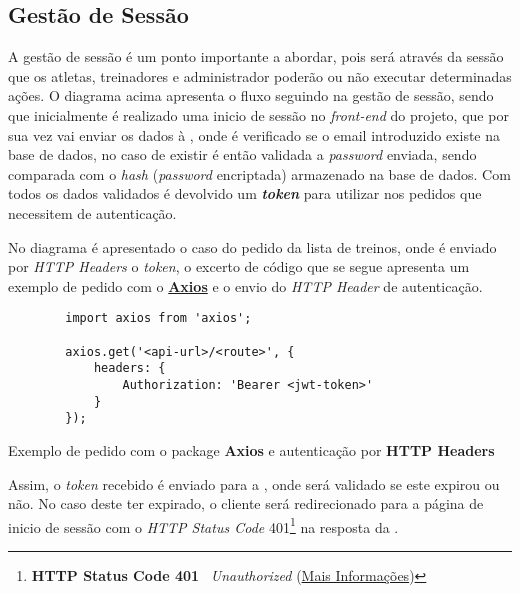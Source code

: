 \subsection{Gestão de Sessão}
\label{sessionSequenceDiagram}


A gestão de sessão é um ponto importante a abordar, pois será através da sessão que os atletas, treinadores e administrador poderão ou não executar determinadas ações. O diagrama acima apresenta o fluxo seguindo  na gestão de sessão, sendo que inicialmente é realizado uma inicio de sessão no \textit{front-end} do projeto, que por sua vez vai enviar os dados à \textbf{}, onde é verificado se o email introduzido existe na base de dados, no caso de existir é então validada a \textit{password} enviada, sendo comparada com o \textit{hash} (\textit{password} encriptada) armazenado na base de dados. Com todos os dados validados é devolvido um \textbf{ \textit{token}} para utilizar nos pedidos que necessitem de autenticação.

No diagrama é apresentado o caso do pedido da lista de treinos, onde é enviado por \textit{HTTP Headers} o \textit{token}, o excerto de código que se segue apresenta um exemplo de pedido com o \textit{} \textbf{\href{https://github.com/axios/axios}{Axios}} e o envio do \textit{HTTP Header} de autenticação.

\begin{longlisting}
	\begin{verbatim}
		import axios from 'axios';

		axios.get('<api-url>/<route>', {
			headers: {
				Authorization: 'Bearer <jwt-token>'
			}
		});
	\end{verbatim}

	\caption{Exemplo de pedido com o package \textbf{Axios} e autenticação por \textbf{HTTP Headers}}
\end{longlisting}

Assim, o \textit{token} \textbf{} recebido é enviado para a \textbf{}, onde será validado se este expirou ou não. No caso deste ter expirado, o cliente será redirecionado para a página de inicio de sessão com o \textit{HTTP Status Code} 401\footnote{\textbf{HTTP Status Code 401 \textemdash} ~\textit{Unauthorized} (\href{https://developer.mozilla.org/pt-BR/docs/Web/HTTP/Status/401}{Mais Informações})} na resposta da \textbf{}.